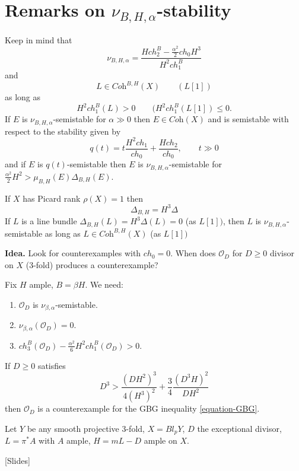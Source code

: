 \section{Remarks on $\nu_{B,H,\alpha}$-stability}
\label{section-remarks-on-nu-BHalpha-stability}
Keep in mind that
$$
\nu_{B,H,\alpha}=\frac{Hch_2^B-\frac{\alpha^2}{2}ch_0H^3}
{H^2 ch_1^B}
$$
and
$$
L \in \textit{Coh}^{B,H}(X) \qquad (L[1])
$$
as long as
$$
H^2ch_1^B(L)>0 \qquad (H^2ch_1^B(L[1])\leq 0.
$$
\medskip
If $E$ is $\nu_{B,H,\alpha}$-semistable for $\alpha\gg 0$ then 
$E\in\textit{Coh}(X)$ and is semistable with respect to the stability given by
$$
q(t)=t \frac{H^2 ch_1}{ch_0}+ \frac{H ch_2}{ch_0},\qquad t\gg 0
$$
and if $E$ is $q(t)$-semistable then $E$ is $\nu_{B,H,\alpha}$-semistable for 
$\frac{\alpha^2}{2}H^2>\mu_{B,H}(E)\Delta_{B,H}(E)$.

If $X$ has Picard rank $\rho(X)=1$ then 
 $$
\Delta_{B,H}=H^3\Delta
$$
If $L$ is a line bundle $\Delta_{B,H}(L)=H^3\Delta(L)=0$ (as $L[1])$, 
then $L$ is 
$\nu_{B,H,\alpha}$-semistable as long as $L \in \textit{Coh}^{B,H}(X)$ 
(as $L[1])$

\medskip\noindent
{\bf Idea.} Look for counterexamples with $ch_0=0$. When does $\mathcal{O}_D$
for $D\geq 0$ divisor on $X$ (3-fold) produces a counterexample?

Fix $H$ ample, $B=\beta H$. We need:
\begin{enumerate}
\item $\mathcal{O}_D$ is $\nu_{\beta,\alpha}$-semistable.
\item $\nu_{\beta,\alpha}(\mathcal{O}_D)=0$.
\item $ch_3^B(\mathcal{O}_D)-\frac{\alpha^2}{6}H^2ch_1^B(\mathcal{O}_D)>0$.
\end{enumerate}

\begin{lemma}
\label{lemma-counterexample}
If $D \geq 0$ satisfies
$$
D^3>\frac{(DH^2)^3}{4(H^3)^2}+\frac{3}{4}\frac{(D^3H)^2}{DH^2}
$$
then $\mathcal{O}_D$ is a counterexample for the GBG inequality
\ref{equation-GBG}.
\end{lemma}

\begin{example}
\label{example-}
Let $Y$ be any smooth projective 3-fold, $X=Bl_pY$, $D$ the exceptional divisor,
$L=\pi^*A$ with $A$ ample, $H=mL-D$ ample on $X$.
\end{example}

[Slides]

